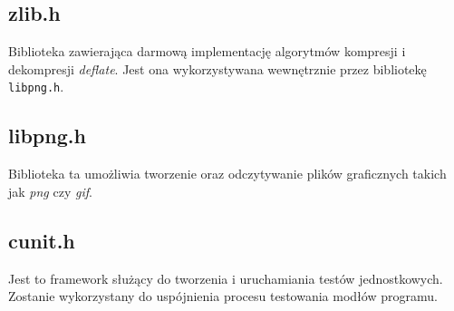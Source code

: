 \documentclass{mwart}
\begin{document}
\subsection{zlib.h}
Biblioteka zawierająca darmową implementację algorytmów kompresji i dekompresji \textit{deflate}. Jest ona wykorzystywana wewnętrznie przez bibliotekę \texttt{libpng.h}.

\subsection{libpng.h}
Biblioteka ta umożliwia tworzenie oraz odczytywanie plików graficznych takich jak \textit{png} czy \textit{gif}.

\subsection{cunit.h}
Jest to framework służący do tworzenia i uruchamiania testów jednostkowych. Zostanie wykorzystany do uspójnienia procesu testowania modłów programu.
\end{document}
